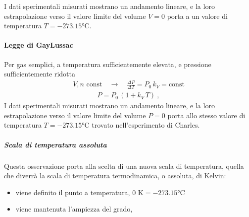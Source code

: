 \documentclass[letterpaper,10pt,italian]{jupyterBook}
\begin{document}
\sphinxAtStartPar
I dati sperimentali misurati mostrano un andamento lineare, e la loro estrapolazione verso il valore limite del volume \(V = 0\) porta a un valore di temperatura \(T = -273.15 \text{°C}\).


\paragraph{Legge di Gay\sphinxhyphen{}Lussac}
\label{\detokenize{ch/thermodynamics/ideal-gas-experiments:legge-di-gay-lussac}}\label{\detokenize{ch/thermodynamics/ideal-gas-experiments:physics-hs-thermodynamics-matter-gases-ideal-experiments-gay-lussac}}
\sphinxAtStartPar
Per gas semplici, a temperatura sufficientemente elevata, e pressione sufficientemente ridotta
\begin{equation*}
\begin{split}V, n \text{ const} \quad \rightarrow \quad \frac{\Delta P}{\Delta T} = P_0 \, k_V = \text{const}\end{split}
\end{equation*}\begin{equation*}
\begin{split}P = P_0 \, ( 1 + k_V \, T ) \ ,\end{split}
\end{equation*}
\sphinxAtStartPar
I dati sperimentali misurati mostrano un andamento lineare, e la loro estrapolazione verso il valore limite del volume \(P = 0\) porta allo stesso valore di temperatura \(T = -273.15 \text{°C}\) trovato nell’esperimento di Charles.


\subparagraph{Scala di temperatura assoluta}
\label{\detokenize{ch/thermodynamics/ideal-gas-experiments:scala-di-temperatura-assoluta}}\label{\detokenize{ch/thermodynamics/ideal-gas-experiments:physics-hs-thermodynamics-matter-gases-ideal-experiments-t-kelvin}}
\sphinxAtStartPar
Questa osservazione porta alla scelta di una nuova scala di temperatura, quella che diverrà la scala di temperatura termodinamica, o assoluta, di Kelvin:
\begin{itemize}
\item {} 
\sphinxAtStartPar
viene definito il punto a temperatura, \(0 \text{ K} = -273.15 \text{°C}\)

\item {} 
\sphinxAtStartPar
viene mantenuta l’ampiezza del grado,

\end{itemize}
\end{document}

